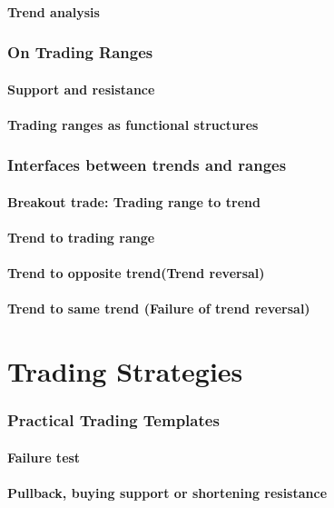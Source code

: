 \documentclass[10pt,twocolumn]{article}
\begin{document}
\subsection{Trend analysis}

\section{On Trading Ranges}
\subsection{Support and resistance}
\subsection{Trading ranges as functional structures}
\section{Interfaces between trends and ranges}
\subsection{Breakout trade: Trading range to trend}
\subsection{Trend to trading range}
\subsection{Trend to opposite trend(Trend reversal)}
\subsection{Trend to same trend (Failure of trend reversal)}

\part{Trading Strategies}
\section{Practical Trading Templates}
\subsection{Failure test}
\subsection{Pullback, buying support or shortening resistance}
\end{document}
